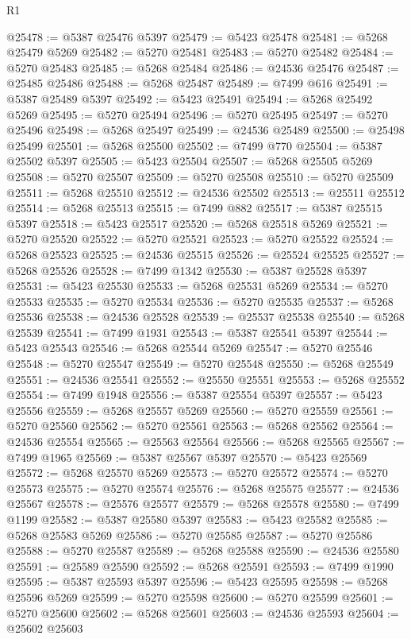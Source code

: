 \begin{lexlean}{R1}
\begin{coremodule}
@25478 := @5387 @25476 @5397
@25479 := @5423 @25478
@25481 := @5268 @25479 @5269
@25482 := @5270 @25481
@25483 := @5270 @25482
@25484 := @5270 @25483
@25485 := @5268 @25484
@25486 := @24536 @25476
@25487 := @25485 @25486
@25488 := @5268 @25487
@25489 := @7499 @616
@25491 := @5387 @25489 @5397
@25492 := @5423 @25491
@25494 := @5268 @25492 @5269
@25495 := @5270 @25494
@25496 := @5270 @25495
@25497 := @5270 @25496
@25498 := @5268 @25497
@25499 := @24536 @25489
@25500 := @25498 @25499
@25501 := @5268 @25500
@25502 := @7499 @770
@25504 := @5387 @25502 @5397
@25505 := @5423 @25504
@25507 := @5268 @25505 @5269
@25508 := @5270 @25507
@25509 := @5270 @25508
@25510 := @5270 @25509
@25511 := @5268 @25510
@25512 := @24536 @25502
@25513 := @25511 @25512
@25514 := @5268 @25513
@25515 := @7499 @882
@25517 := @5387 @25515 @5397
@25518 := @5423 @25517
@25520 := @5268 @25518 @5269
@25521 := @5270 @25520
@25522 := @5270 @25521
@25523 := @5270 @25522
@25524 := @5268 @25523
@25525 := @24536 @25515
@25526 := @25524 @25525
@25527 := @5268 @25526
@25528 := @7499 @1342
@25530 := @5387 @25528 @5397
@25531 := @5423 @25530
@25533 := @5268 @25531 @5269
@25534 := @5270 @25533
@25535 := @5270 @25534
@25536 := @5270 @25535
@25537 := @5268 @25536
@25538 := @24536 @25528
@25539 := @25537 @25538
@25540 := @5268 @25539
@25541 := @7499 @1931
@25543 := @5387 @25541 @5397
@25544 := @5423 @25543
@25546 := @5268 @25544 @5269
@25547 := @5270 @25546
@25548 := @5270 @25547
@25549 := @5270 @25548
@25550 := @5268 @25549
@25551 := @24536 @25541
@25552 := @25550 @25551
@25553 := @5268 @25552
@25554 := @7499 @1948
@25556 := @5387 @25554 @5397
@25557 := @5423 @25556
@25559 := @5268 @25557 @5269
@25560 := @5270 @25559
@25561 := @5270 @25560
@25562 := @5270 @25561
@25563 := @5268 @25562
@25564 := @24536 @25554
@25565 := @25563 @25564
@25566 := @5268 @25565
@25567 := @7499 @1965
@25569 := @5387 @25567 @5397
@25570 := @5423 @25569
@25572 := @5268 @25570 @5269
@25573 := @5270 @25572
@25574 := @5270 @25573
@25575 := @5270 @25574
@25576 := @5268 @25575
@25577 := @24536 @25567
@25578 := @25576 @25577
@25579 := @5268 @25578
@25580 := @7499 @1199
@25582 := @5387 @25580 @5397
@25583 := @5423 @25582
@25585 := @5268 @25583 @5269
@25586 := @5270 @25585
@25587 := @5270 @25586
@25588 := @5270 @25587
@25589 := @5268 @25588
@25590 := @24536 @25580
@25591 := @25589 @25590
@25592 := @5268 @25591
@25593 := @7499 @1990
@25595 := @5387 @25593 @5397
@25596 := @5423 @25595
@25598 := @5268 @25596 @5269
@25599 := @5270 @25598
@25600 := @5270 @25599
@25601 := @5270 @25600
@25602 := @5268 @25601
@25603 := @24536 @25593
@25604 := @25602 @25603

\end{coremodule}
\end{lexlean}
